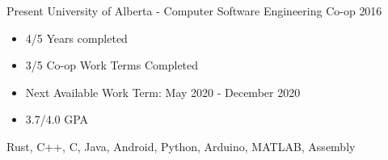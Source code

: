 
  

\begin{experiences}
    \experience
      {Present}   {University of Alberta - Computer Software Engineering Co-op}{}{}
      {2016} {
                        \begin{itemize}
                          \item 4/5 Years completed
                          \item 3/5 Co-op Work Terms Completed
                          \item Next Available Work Term: May 2020 - December 2020
			  \item 3.7/4.0 GPA
                        \end{itemize}
                      }
                      {
                        Rust,
                        C++,
                        C,
                        Java,
                        Android,
                        Python,
                        Arduino,
                        MATLAB,
                        Assembly
                      }
  
  \end{experiences}
